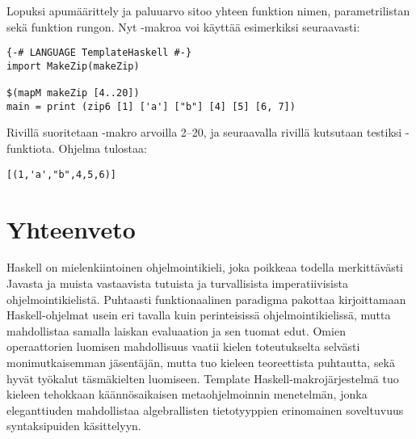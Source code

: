 Lopuksi apumäärittely  ja paluuarvo  sitoo yhteen
funktion nimen, parametrilistan sekä funktion rungon.
Nyt -makroa voi käyttää esimerkiksi seuraavasti:
\begin{verbatim}
{-# LANGUAGE TemplateHaskell #-}
import MakeZip(makeZip)

$(mapM makeZip [4..20])
main = print (zip6 [1] ['a'] ["b"] [4] [5] [6, 7])
\end{verbatim}
\iffalse
$ %
\fi
Rivillä  suoritetaan -makro arvoilla 2--20,
ja seuraavalla rivillä kutsutaan testiksi -funktiota.
Ohjelma tulostaa:
\begin{verbatim}
[(1,'a',"b",4,5,6)]
\end{verbatim}

\section{Yhteenveto}
Haskell on mielenkiintoinen ohjelmointikieli, joka poikkeaa todella merkittävästi Javasta
ja muista vastaavista tutuista ja turvallisista imperatiivisista ohjelmointikielistä.
Puhtaasti funktionaalinen paradigma pakottaa kirjoittamaan Haskell-ohjelmat usein
eri tavalla kuin perinteisissä ohjelmointikielissä,
mutta mahdollistaa samalla laiskan evaluaation ja sen tuomat edut.
Omien operaattorien luomisen mahdollisuus vaatii kielen toteutukselta selvästi monimutkaisemman jäsentäjän,
mutta tuo kieleen teoreettista puhtautta, sekä hyvät työkalut täsmäkielten luomiseen.
Template Haskell-makrojärjestelmä tuo kieleen tehokkaan käännösaikaisen metaohjelmoinnin menetelmän,
jonka eleganttiuden mahdollistaa algebrallisten tietotyyppien erinomainen soveltuvuus syntaksipuiden käsittelyyn.

